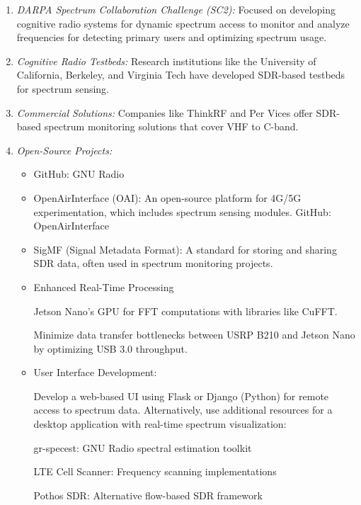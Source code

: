 \documentclass[11pt]{report}
\begin{document}
\begin{description}
\begin{enumerate}[label=\roman*)]
	\item 
\emph{DARPA Spectrum Collaboration Challenge (SC2):} Focused on developing cognitive radio systems for dynamic spectrum access to monitor and analyze frequencies for detecting primary users and optimizing spectrum usage.
	\item
\emph{Cognitive Radio Testbeds:} Research institutions like the University of California, Berkeley, and Virginia Tech have developed SDR-based testbeds for spectrum sensing.
	\item
\emph{Commercial Solutions:} Companies like ThinkRF and Per Vices offer SDR-based spectrum monitoring solutions that cover VHF to C-band.
	\item
\emph{Open-Source Projects:}
\begin{itemize}
	\item GitHub: GNU Radio
	\item OpenAirInterface (OAI): An open-source platform for 4G/5G experimentation, which includes spectrum sensing modules. GitHub: OpenAirInterface
	\item SigMF (Signal Metadata Format): A standard for storing and sharing SDR data, often used in spectrum monitoring projects.
	\item Enhanced Real-Time Processing 
	
	Jetson Nano’s GPU for FFT computations with libraries like CuFFT.
	
	Minimize data transfer bottlenecks between USRP B210 and Jetson Nano by optimizing USB 3.0 throughput.
	\item User Interface Development:
	
	Develop a web-based UI using Flask or Django (Python) for remote access to spectrum data. Alternatively, use additional resources for a desktop application with real-time spectrum visualization:
	
	gr-specest: GNU Radio spectral estimation toolkit
	
	LTE Cell Scanner: Frequency scanning implementations
	
	Pothos SDR: Alternative flow-based SDR framework

\end{itemize}
\end{enumerate}
\end{description}
\end{document}
